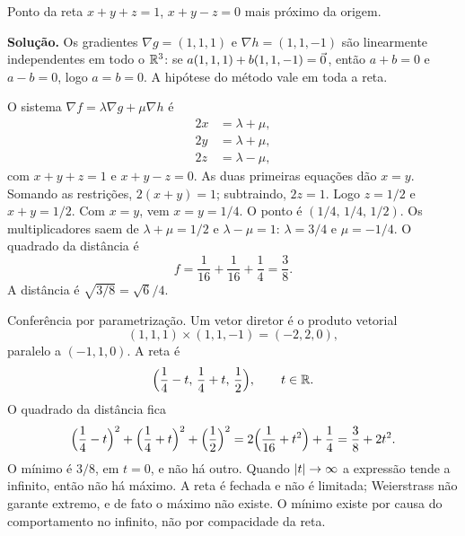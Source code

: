\documentclass[11pt,a4paper]{article}
\begin{document}
\begin{exercicio}
Ponto da reta $x+y+z=1$, $x+y-z=0$ mais próximo da origem.

\textbf{Solução.}
Os gradientes $\nabla g=(1,1,1)$ e $\nabla h=(1,1,-1)$ são linearmente independentes em todo o $\mathbb{R}^3$: se $a(1,1,1)+b(1,1,-1)=\vec{0}$, então $a+b=0$ e $a-b=0$, logo $a=b=0$. A hipótese do método vale em toda a reta.

O sistema $\nabla f=\lambda\nabla g+\mu\nabla h$ é
\begin{align*}
2x&=\lambda+\mu,\\
2y&=\lambda+\mu,\\
2z&=\lambda-\mu,
\end{align*}
com $x+y+z=1$ e $x+y-z=0$. As duas primeiras equações dão $x=y$. Somando as restrições, $2(x+y)=1$; subtraindo, $2z=1$. Logo $z=1/2$ e $x+y=1/2$. Com $x=y$, vem $x=y=1/4$. O ponto é $(1/4,\,1/4,\,1/2)$. Os multiplicadores saem de $\lambda+\mu=1/2$ e $\lambda-\mu=1$: $\lambda=3/4$ e $\mu=-1/4$. O quadrado da distância é
\[
f=\frac{1}{16}+\frac{1}{16}+\frac14=\frac{3}{8}.
\]
A distância é $\sqrt{3/8}=\sqrt{6}/4$.

Conferência por parametrização. Um vetor diretor é o produto vetorial
\[
(1,1,1)\times(1,1,-1)=(-2,2,0),
\]
paralelo a $(-1,1,0)$. A reta é
\[
\Bigl(\frac14-t,\,\frac14+t,\,\frac12\Bigr),\qquad t\in\mathbb{R}.
\]
O quadrado da distância fica
\[
\Bigl(\frac14-t\Bigr)^2+\Bigl(\frac14+t\Bigr)^2+\Bigl(\frac12\Bigr)^2
=2\Bigl(\frac{1}{16}+t^2\Bigr)+\frac14
=\frac{3}{8}+2t^2.
\]
O mínimo é $3/8$, em $t=0$, e não há outro. Quando $\left\lvert t \right\rvert\to\infty$ a expressão tende a infinito, então não há máximo. A reta é fechada e não é limitada; Weierstrass não garante extremo, e de fato o máximo não existe. O mínimo existe por causa do comportamento no infinito, não por compacidade da reta.
\end{exercicio}
\end{document}
